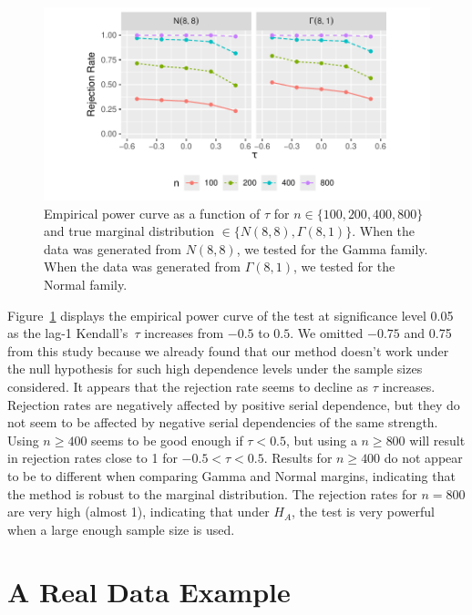 \documentclass[12pt]{article}
\begin{document}
\begin{figure}[tbp]
  \centering
  \includegraphics[scale=1]{figures/rr}
  \caption{Empirical power curve as a function of $\tau$ for
    $n \in \{100, 200, 400, 800\}$ and true marginal distribution
    $\in \{N(8,8), \Gamma(8,1)\}$. When the data was generated from $N(8,8)$,
    we tested for the Gamma family. When the data was generated from
    $\Gamma(8,1)$, we tested for the Normal family.
  }
  \label{fig:rr}
\end{figure}


Figure~\ref{fig:rr} displays the empirical power curve of the test at
significance level 0.05 as the lag-1 Kendall's~$\tau$ increases from
$-0.5$ to $0.5$. We omitted $-0.75$ and 0.75 from this study because we already
found that our method doesn't work under the null hypothesis for such high
dependence levels under the sample sizes considered. It appears that the
rejection rate seems to decline as $\tau$
increases. Rejection rates are negatively affected by positive serial
dependence, but they do not seem to be affected by negative serial dependencies
of the same strength.
Using $n \geq 400$ seems to be good enough
if $\tau < 0.5$, but using a $n \geq 800$ will result in
rejection rates close to 1 for $-0.5 < \tau < 0.5$. 
Results for $n \geq 400$
do not appear to be to different when comparing Gamma and Normal
margins, indicating that the method is robust to the marginal distribution.
The rejection rates for $n = 800$ are very
high (almost 1), indicating that under $H_A$, the test is very powerful
when a large enough sample size is used.


\section{A Real Data Example}
\label{sec:real}
\end{document}

